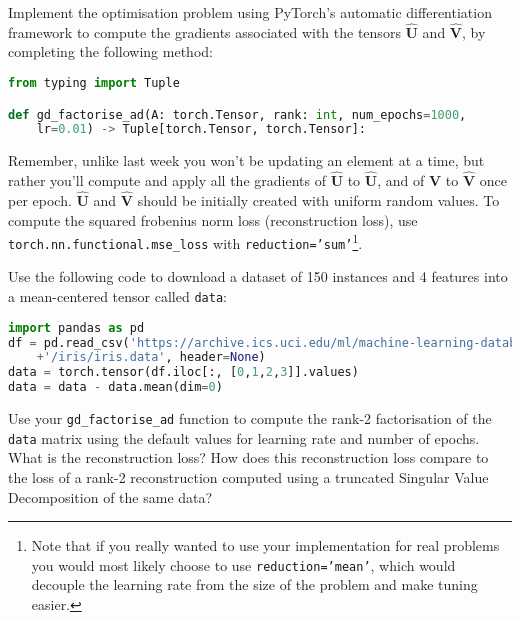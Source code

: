 \documentclass[a4paper]{article}
\begin{document}
\begin{tcolorbox}[title=1.1 Implement gradient-based factorisation using PyTorch's AD (1 mark)]
Implement the optimisation problem using PyTorch's automatic differentiation framework to compute the gradients associated with the tensors $\hat{\bm U}$ and $\hat{\bm V}$, by completing the following method:

\begin{lstlisting}[language=Python]
from typing import Tuple

def gd_factorise_ad(A: torch.Tensor, rank: int, num_epochs=1000, 
	lr=0.01) -> Tuple[torch.Tensor, torch.Tensor]:
\end{lstlisting}

Remember, unlike last week you won't be updating an element at a time, but rather you'll compute and apply all the gradients of $\hat{\bm U}$ to $\hat{\bm U}$, and of $\hat{\bm V}$ to $\hat{\bm V}$ once per epoch. $\hat{\bm U}$ and $\hat{\bm V}$ should be initially created with uniform random values. To compute the squared frobenius norm loss (reconstruction loss), use \texttt{torch.nn.functional.mse\_loss} with \texttt{reduction='sum'}\footnote{Note that if you really wanted to use your implementation for real problems you would most likely choose to use \texttt{reduction='mean'}, which would decouple the learning rate from the size of the problem and make tuning easier.}.
\end{tcolorbox}

\begin{tcolorbox}[title=1.2 Factorise and compute reconstruction error on real data (1 mark)]
Use the following code to download a dataset of 150 instances and 4 features into a mean-centered tensor called \texttt{data}:

\begin{lstlisting}[language=Python]
import pandas as pd
df = pd.read_csv('https://archive.ics.uci.edu/ml/machine-learning-databases'
	+'/iris/iris.data', header=None)
data = torch.tensor(df.iloc[:, [0,1,2,3]].values)
data = data - data.mean(dim=0)
\end{lstlisting}

Use your \texttt{gd\_factorise\_ad} function to compute the rank-2 factorisation of the \texttt{data} matrix using the default values for learning rate and number of epochs. What is the reconstruction loss? How does this reconstruction loss compare to the loss of a rank-2 reconstruction computed using a truncated Singular Value Decomposition of the same data?
\end{tcolorbox}
\end{document}
